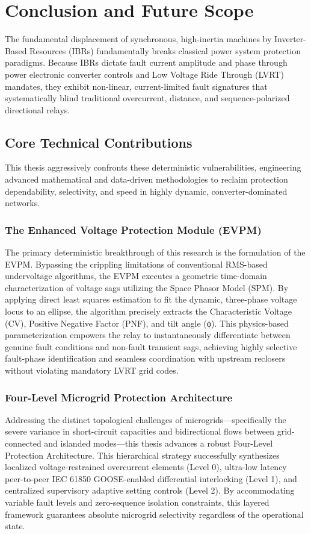 \chapter{Conclusion and Future Scope}
The fundamental displacement of synchronous, high-inertia machines by Inverter-Based Resources (IBRs) fundamentally breaks classical power system protection paradigms. Because IBRs dictate fault current amplitude and phase through power electronic converter controls and Low Voltage Ride Through (LVRT) mandates, they exhibit non-linear, current-limited fault signatures that systematically blind traditional overcurrent, distance, and sequence-polarized directional relays. 
\section{Core Technical Contributions}
This thesis aggressively confronts these deterministic vulnerabilities, engineering advanced mathematical and data-driven methodologies to reclaim protection dependability, selectivity, and speed in highly dynamic, converter-dominated networks.
\subsection{The Enhanced Voltage Protection Module (EVPM)} 
The primary deterministic breakthrough of this research is the formulation of the EVPM. Bypassing the crippling limitations of conventional RMS-based undervoltage algorithms, the EVPM executes a geometric time-domain characterization of voltage sags utilizing the Space Phasor Model (SPM). By applying direct least squares estimation to fit the dynamic, three-phase voltage locus to an ellipse, the algorithm precisely extracts the Characteristic Voltage (CV), Positive Negative Factor (PNF), and tilt angle (ϕ). This physics-based parameterization empowers the relay to instantaneously differentiate between genuine fault conditions and non-fault transient sags, achieving highly selective fault-phase identification and seamless coordination with upstream reclosers without violating mandatory LVRT grid codes.
\subsection{Four-Level Microgrid Protection Architecture}
Addressing the distinct topological challenges of microgrids—specifically the severe variance in short-circuit capacities and bidirectional flows between grid-connected and islanded modes—this thesis advances a robust Four-Level Protection Architecture. This hierarchical strategy successfully synthesizes localized voltage-restrained overcurrent elements (Level 0), ultra-low latency peer-to-peer IEC 61850 GOOSE-enabled differential interlocking (Level 1), and centralized supervisory adaptive setting controls (Level 2). By accommodating variable fault levels and zero-sequence isolation constraints, this layered framework guarantees absolute microgrid selectivity regardless of the operational state.
